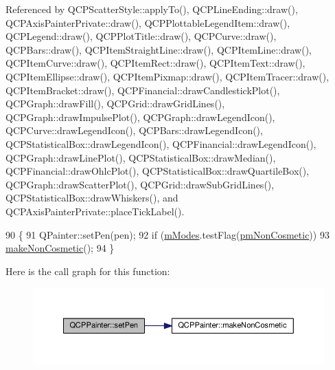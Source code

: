 Referenced by Q\+C\+P\+Scatter\+Style\+::apply\+To(), Q\+C\+P\+Line\+Ending\+::draw(), Q\+C\+P\+Axis\+Painter\+Private\+::draw(), Q\+C\+P\+Plottable\+Legend\+Item\+::draw(), Q\+C\+P\+Legend\+::draw(), Q\+C\+P\+Plot\+Title\+::draw(), Q\+C\+P\+Curve\+::draw(), Q\+C\+P\+Bars\+::draw(), Q\+C\+P\+Item\+Straight\+Line\+::draw(), Q\+C\+P\+Item\+Line\+::draw(), Q\+C\+P\+Item\+Curve\+::draw(), Q\+C\+P\+Item\+Rect\+::draw(), Q\+C\+P\+Item\+Text\+::draw(), Q\+C\+P\+Item\+Ellipse\+::draw(), Q\+C\+P\+Item\+Pixmap\+::draw(), Q\+C\+P\+Item\+Tracer\+::draw(), Q\+C\+P\+Item\+Bracket\+::draw(), Q\+C\+P\+Financial\+::draw\+Candlestick\+Plot(), Q\+C\+P\+Graph\+::draw\+Fill(), Q\+C\+P\+Grid\+::draw\+Grid\+Lines(), Q\+C\+P\+Graph\+::draw\+Impulse\+Plot(), Q\+C\+P\+Graph\+::draw\+Legend\+Icon(), Q\+C\+P\+Curve\+::draw\+Legend\+Icon(), Q\+C\+P\+Bars\+::draw\+Legend\+Icon(), Q\+C\+P\+Statistical\+Box\+::draw\+Legend\+Icon(), Q\+C\+P\+Financial\+::draw\+Legend\+Icon(), Q\+C\+P\+Graph\+::draw\+Line\+Plot(), Q\+C\+P\+Statistical\+Box\+::draw\+Median(), Q\+C\+P\+Financial\+::draw\+Ohlc\+Plot(), Q\+C\+P\+Statistical\+Box\+::draw\+Quartile\+Box(), Q\+C\+P\+Graph\+::draw\+Scatter\+Plot(), Q\+C\+P\+Grid\+::draw\+Sub\+Grid\+Lines(), Q\+C\+P\+Statistical\+Box\+::draw\+Whiskers(), and Q\+C\+P\+Axis\+Painter\+Private\+::place\+Tick\+Label().


\begin{DoxyCode}
90                                        \{
91   QPainter::setPen(pen);
92   \textcolor{keywordflow}{if} (\hyperlink{class_q_c_p_painter_af5d1d6e5df0adbc7de5633250fb3396c}{mModes}.testFlag(\hyperlink{class_q_c_p_painter_a156cf16444ff5e0d81a73c615fdb156dac1e481bfaf408f2bd2eaad3ec341f36b}{pmNonCosmetic}))
93     \hyperlink{class_q_c_p_painter_a7e63fbcf47e35c6f2ecd11b8fef7c7d8}{makeNonCosmetic}();
94 \}
\end{DoxyCode}


Here is the call graph for this function\+:\nopagebreak
\begin{figure}[H]
\begin{center}
\leavevmode
\includegraphics[width=350pt]{class_q_c_p_painter_af9c7a4cd1791403901f8c5b82a150195_cgraph}
\end{center}
\end{figure}




